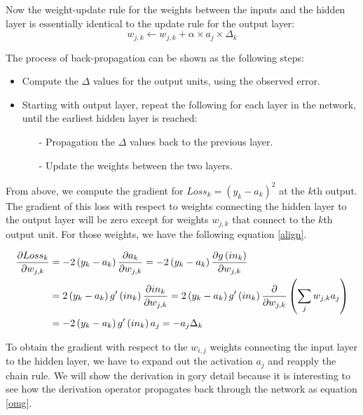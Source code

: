 \documentclass{mcmthesis}
\begin{document}
	Now the weight-update rule for the weights between the inputs and the hidden layer is essentially identical to the update rule for the output layer:
	\begin{equation}
	    w_{j,k}\leftarrow w_{j,k}+\alpha \times a_{j} \times\Delta _{k}
	\end{equation}
	
	The process of back-propagation can be shown as the following steps:
\begin{itemize}
\item Compute the $\Delta$ values for the output units, using the observed error.
\item Starting with output layer, repeat the following for each layer in the network, until the earliest hidden layer is reached:
\begin{itemize}
    \item[-] Propagation the $\Delta$ values back to the previous layer.
    \item[-] Update the weights between the two layers.
\end{itemize}
\end{itemize}

From above, we compute the gradient for $Loss_{k}=\left ( y_{k}-a_{k} \right )^{2}$ at the $k$th output. The gradient of this loss with respect to weights connecting the hidden layer to the output layer will be zero except for weights $w_{j,k}$ that connect to the $k$th output unit. For those weights, we have the following equation \ref{align}.

\begin{align}
\label{align}
\frac{\partial Loss_{k}}{\partial w_{j,k}}
&=-2\left ( y_{k}-a_{k} \right )\frac{\partial a_{k}}{\partial w_{j,k}}=-2\left ( y_{k}-a_{k} \right )\frac{\partial g\left ( in_{k} \right )}{\partial w_{j,k}} \notag\\
&=2\left ( y_{k}-a_{k} \right )g{}'\left ( in_{k} \right )\frac{\partial in_{k}}{\partial w_{j,k}} = 2\left ( y_{k}-a_{k} \right )g{}'\left ( in_{k} \right )\frac{\partial }{\partial w_{j,k}} \left ( \sum_{j} w_{j,k}a_{j}\right )\notag\\
&=-2\left ( y_{k}-a_{k} \right )g{}'\left ( in_{k} \right )a_{j}=-a_{j}\Delta _{k}
\end{align}

To obtain the gradient with respect to the $w_{i,j}$ weights connecting the input layer to the hidden layer, we have to expand out the activation $a_{j}$ and reapply the chain rule. We will show the derivation in gory detail because it is interesting to see how the derivation operator propagates back through the network as equation \ref{omg}.
\end{document}
